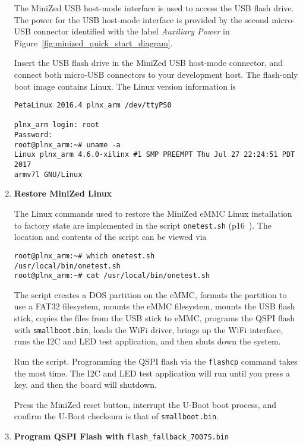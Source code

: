\begin{enumerate}
The MiniZed USB host-mode interface is used to access the USB flash drive.
The power for the USB host-mode interface is provided by the second
micro-USB connector identified with the label \emph{Auxiliary Power} in
Figure~\ref{fig:minized_quick_start_diagram}.

Insert the USB flash drive in the MiniZed USB host-mode connector, and
connect both micro-USB connectors to your development host. The flash-only
boot image contains Linux. The Linux version information is
%
\begin{verbatim}
PetaLinux 2016.4 plnx_arm /dev/ttyPS0

plnx_arm login: root
Password:
root@plnx_arm:~# uname -a
Linux plnx_arm 4.6.0-xilinx #1 SMP PREEMPT Thu Jul 27 22:24:51 PDT 2017
armv7l GNU/Linux
\end{verbatim}

\item \textbf{Restore MiniZed Linux}

The Linux commands used to restore the MiniZed eMMC Linux installation to factory state are
implemented in the script \verb+onetest.sh+ (p16~\cite{Avnet_MiniZed_Restore_2018}).
The location and contents of the script can be viewed via
%
\begin{verbatim}
root@plnx_arm:~# which onetest.sh
/usr/local/bin/onetest.sh
root@plnx_arm:~# cat /usr/local/bin/onetest.sh
\end{verbatim}
%
The script creates a DOS partition on the eMMC, formats the partition to use a FAT32
filesystem, mounts the eMMC filesystem, mounts the USB flash stick, copies the files
from the USB stick to eMMC, programs the QSPI flash with \verb+smallboot.bin+,
loads the WiFi driver, brings up the WiFi interface, runs the I2C and LED
test application, and then shuts down the system.

Run the script. Programming the QSPI flash via the \verb+flashcp+ command takes
the most time. The I2C and LED test application will run until you press a key,
and then the board will shutdown.

Press the MiniZed reset button, interrupt the U-Boot boot process, and confirm
the U-Boot checksum is that of \verb+smallboot.bin+.

\item \textbf{Program QSPI Flash with} \verb+flash_fallback_7007S.bin+


\end{enumerate}

